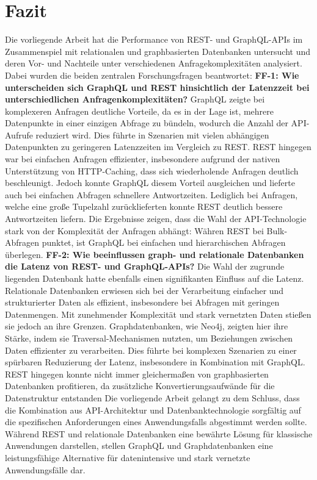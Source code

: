 \chapter{Fazit} %
\label{sec:fazit}
Die vorliegende Arbeit hat die Performance von REST- und GraphQL-APIs im Zusammenspiel mit relationalen und graphbasierten Datenbanken untersucht und deren Vor- und Nachteile unter verschiedenen Anfragekomplexitäten analysiert. Dabei wurden die beiden zentralen Forschungsfragen beantwortet:
\newline
\noindent
\textbf{FF-1: Wie unterscheiden sich GraphQL und REST hinsichtlich der Latenzzeit bei unterschiedlichen Anfragenkomplexitäten?}
GraphQL zeigte bei komplexeren Anfragen deutliche Vorteile, da es in der Lage ist, mehrere Datenpunkte in einer einzigen Abfrage zu bündeln, wodurch die Anzahl der API-Aufrufe reduziert wird. Dies führte in Szenarien mit vielen abhängigen Datenpunkten zu geringeren Latenzzeiten im Vergleich zu REST. REST hingegen war bei einfachen Anfragen effizienter, insbesondere aufgrund der nativen Unterstützung von HTTP-Caching, dass sich wiederholende Anfragen deutlich beschleunigt. Jedoch konnte GraphQL diesem Vorteil ausgleichen und lieferte auch bei einfachen Abfragen schnellere Antwortzeiten. Lediglich bei Anfragen, welche eine große Tupelzahl zurücklieferten konnte REST deutlich bessere Antwortzeiten liefern. Die Ergebnisse zeigen, dass die Wahl der API-Technologie stark von der Komplexität der Anfragen abhängt: Währen REST bei Bulk-Abfragen punktet, ist GraphQL bei einfachen und hierarchischen Abfragen überlegen.
\newline
\noindent
\textbf{FF-2: Wie beeinflussen graph- und relationale Datenbanken die Latenz von REST- und GraphQL-APIs?}
Die Wahl der zugrunde liegenden Datenbank hatte ebenfalls einen signifikanten Einfluss auf die Latenz. Relationale Datenbanken erwiesen sich bei der Verarbeitung einfacher und strukturierter Daten als effizient, insbesondere bei Abfragen mit geringen Datenmengen. Mit zunehmender Komplexität und stark vernetzten Daten stießen sie jedoch an ihre Grenzen. Graphdatenbanken, wie Neo4j, zeigten hier ihre Stärke, indem sie Traversal-Mechanismen nutzten, um Beziehungen zwischen Daten effizienter zu verarbeiten. Dies führte bei komplexen Szenarien zu einer spürbaren Reduzierung der Latenz, insbesondere in Kombination mit GraphQL. REST hingegen konnte nicht immer gleichermaßen von graphbasierten Datenbanken profitieren, da zusätzliche Konvertierungsaufwände für die Datenstruktur entstanden
\newline
\noindent
Die vorliegende Arbeit gelangt zu dem Schluss, dass die Kombination aus API-Architektur und Datenbanktechnologie sorgfältig auf die spezifischen Anforderungen eines Anwendungsfalls abgestimmt werden sollte. Während REST und relationale Datenbanken eine bewährte Lösung für klassische Anwendungen darstellen, stellen GraphQL und Graphdatenbanken eine leistungsfähige Alternative für datenintensive und stark vernetzte Anwendungsfälle dar.




